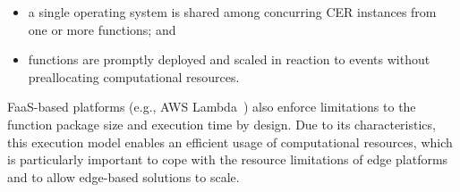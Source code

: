 \begin{itemize}
    \item a single operating system is shared among concurring CER instances from one or more functions; and
    \item functions are promptly deployed and scaled in reaction to events without preallocating computational resources.
\end{itemize}

FaaS-based platforms (e.g., AWS Lambda~\cite{AWSLambda}) also enforce limitations to the function package size and execution time by design. Due to its characteristics, this execution model enables an efficient usage of computational resources, which is particularly important to cope with the resource limitations of edge platforms and to allow edge-based solutions to scale.




%



